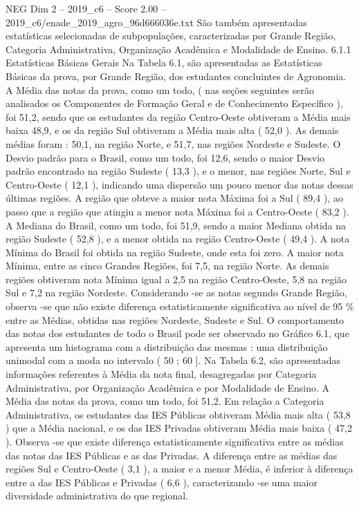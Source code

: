 \begin{textsample}{NEG Dim 2 – 2019\_c6 – Score 2.00 – 2019\_c6/enade\_2019\_agro\_96d666036e.txt}
São também apresentadas estatísticas selecionadas de subpopulações, caracterizadas por Grande Região, Categoria Administrativa, Organização Acadêmica e Modalidade de Ensino. 6.1.1 Estatísticas Básicas Gerais Na Tabela 6.1, são apresentadas as Estatísticas Básicas da prova, por Grande Região, dos estudantes concluintes de Agronomia.
A Média das notas da prova, como um todo, ( nas seções seguintes serão analisados os Componentes de Formação Geral e de Conhecimento Específico ), foi 51,2, sendo que os estudantes da região Centro-Oeste obtiveram a Média mais baixa 48,9, e os da região Sul obtiveram a Média mais alta ( 52,0 ).
As demais médias foram : 50,1, na região Norte, e 51,7, nas regiões Nordeste e Sudeste.
O Desvio padrão para o Brasil, como um todo, foi 12,6, sendo o maior Desvio padrão encontrado na região Sudeste ( 13,3 ), e o menor, nas regiões Norte, Sul e Centro-Oeste ( 12,1 ), indicando uma dispersão um pouco menor das notas dessas últimas regiões.
A região que obteve a maior nota Máxima foi a Sul ( 89,4 ), ao passo que a região que atingiu a menor nota Máxima foi a Centro-Oeste ( 83,2 ).
A Mediana do Brasil, como um todo, foi 51,9, sendo a maior Mediana obtida na região Sudeste ( 52,8 ), e a menor obtida na região Centro-Oeste ( 49,4 ).
A nota Mínima do Brasil foi obtida na região Sudeste, onde esta foi zero.
A maior nota Mínima, entre as cinco Grandes Regiões, foi 7,5, na região Norte.
As demais regiões obtiveram nota Mínima igual a 2,5 na região Centro-Oeste, 5,8 na região Sul e 7,2 na região Nordeste.
Considerando -se as notas segundo Grande Região, observa -se que não existe diferença estatisticamente significativa ao nível de 95 \% entre as Médias, obtidas nas regiões Nordeste, Sudeste e Sul.
O comportamento das notas dos estudantes de todo o Brasil pode ser observado no Gráfico 6.1, que apresenta um histograma com a distribuição das mesmas : uma distribuição unimodal com a moda no intervalo ( 50 ; 60 ].
Na Tabela 6.2, são apresentadas informações referentes à Média da nota final, desagregadas por Categoria Administrativa, por Organização Acadêmica e por Modalidade de Ensino.
A Média das notas da prova, como um todo, foi 51,2.
Em relação a Categoria Administrativa, os estudantes das IES Públicas obtiveram Média mais alta ( 53,8 ) que a Média nacional, e os das IES Privadas obtiveram Média mais baixa ( 47,2 ).
Observa -se que existe diferença estatisticamente significativa entre as médias das notas das IES Públicas e as das Privadas.
A diferença entre as médias das regiões Sul e Centro-Oeste ( 3,1 ), a maior e a menor Média, é inferior à diferença entre a das IES Públicas e Privadas ( 6,6 ), caracterizando -se uma maior diversidade administrativa do que regional.

\end{textsample}
